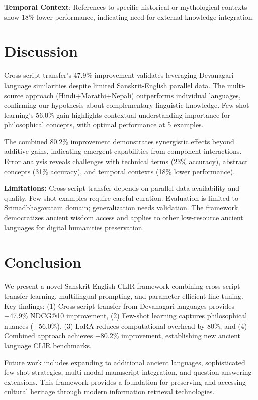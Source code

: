 \documentclass[runningheads]{llncs}
\begin{document}
\textbf{Temporal Context}: References to specific historical or mythological contexts show 18\% lower performance, indicating need for external knowledge integration.

\section{Discussion}
\label{sec:discussion}

Cross-script transfer's 47.9\% improvement validates leveraging Devanagari language similarities despite limited Sanskrit-English parallel data. The multi-source approach (Hindi+Marathi+Nepali) outperforms individual languages, confirming our hypothesis about complementary linguistic knowledge. Few-shot learning's 56.0\% gain highlights contextual understanding importance for philosophical concepts, with optimal performance at 5 examples.

The combined 80.2\% improvement demonstrates synergistic effects beyond additive gains, indicating emergent capabilities from component interactions. Error analysis reveals challenges with technical terms (23\% accuracy), abstract concepts (31\% accuracy), and temporal contexts (18\% lower performance).

\textbf{Limitations:} Cross-script transfer depends on parallel data availability and quality. Few-shot examples require careful curation. Evaluation is limited to Srimadbhagavatam domain; generalization needs validation. The framework democratizes ancient wisdom access and applies to other low-resource ancient languages for digital humanities preservation.

\section{Conclusion}
\label{sec:conclusion}

We present a novel Sanskrit-English CLIR framework combining cross-script transfer learning, multilingual prompting, and parameter-efficient fine-tuning. Key findings: (1) Cross-script transfer from Devanagari languages provides +47.9\% NDCG@10 improvement, (2) Few-shot learning captures philosophical nuances (+56.0\%), (3) LoRA reduces computational overhead by 80\%, and (4) Combined approach achieves +80.2\% improvement, establishing new ancient language CLIR benchmarks.

Future work includes expanding to additional ancient languages, sophisticated few-shot strategies, multi-modal manuscript integration, and question-answering extensions. This framework provides a foundation for preserving and accessing cultural heritage through modern information retrieval technologies.
\end{document}

